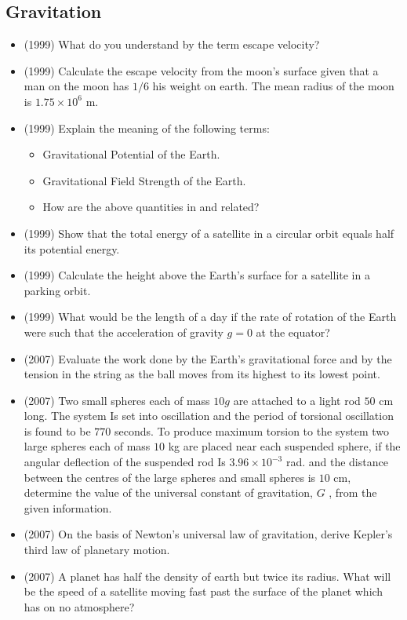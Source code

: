 \documentclass{article}
\begin{document}
\subsection{Gravitation}
\begin{itemize}
\item (1999)  What do you understand by the term escape velocity?
\item (1999)  Calculate the escape velocity from the moon’s surface given that a man on the moon has $ 1/6$ his weight on earth. The mean radius of the moon is $ 1.75 \times 10^6$ m.
\item (1999)  Explain the meaning of the following terms:
 \begin{itemize}
\item Gravitational Potential of the Earth.
\item Gravitational Field Strength of the Earth.
\item How are the above quantities in and related?
\end{itemize}
\item (1999)  Show that the total energy of a satellite in a circular orbit equals half its potential energy.
\item (1999)  Calculate the height above the Earth's surface for a satellite in a parking orbit.
\item (1999)  What would be the length of a day if the rate of rotation of the Earth were such that the acceleration of gravity $ g=0$ at the equator?
\item (2007)  Evaluate the work done by the Earth's gravitational force and by the tension in the string as the ball moves from its highest to its lowest point.
\item (2007)  Two small spheres each of mass $ 10g$ are attached to a light rod $ 50$ cm long. The system Is set into oscillation and the period of torsional oscillation is found to be $ 770$ seconds. To produce maximum torsion to the system two large spheres each of mass $ 10$ kg are placed near each suspended sphere, if the angular deflection of the suspended rod Is $ 3.96 \times 10^{-3}$ rad. and the distance between the centres of the large spheres and small spheres is $ 10$ cm, determine the value of the universal constant of gravitation, $ G$ , from the given information. 
\item (2007)  On the basis of Newton’s universal law of gravitation, derive Kepler’s third law of planetary motion. 
\item (2007)  A planet has half the density of earth but twice its radius. What will be the speed of a satellite moving fast past the surface of the planet which has on no atmosphere?

\end{itemize}
\end{document}
